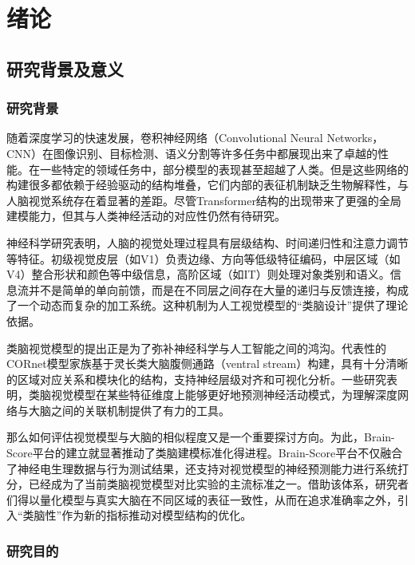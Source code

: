 
\chapter{绪论}

\section{研究背景及意义}

\subsection{研究背景}

随着深度学习的快速发展，卷积神经网络（Convolutional Neural Networks，CNN）在图像识别、目标检测、语义分割等许多任务中都展现出来了卓越的性能。在一些特定的领域任务中，部分模型的表现甚至超越了人类。但是这些网络的构建很多都依赖于经验驱动的结构堆叠，它们内部的表征机制缺乏生物解释性，与人脑视觉系统存在着显著的差距。尽管Transformer结构的出现带来了更强的全局建模能力，但其与人类神经活动的对应性仍然有待研究\cite{ramachandram2017deep}。

神经科学研究表明，人脑的视觉处理过程具有层级结构、时间递归性和注意力调节等特征。初级视觉皮层（如V1）负责边缘、方向等低级特征编码，中层区域（如V4）整合形状和颜色等中级信息，高阶区域（如IT）则处理对象类别和语义。信息流并不是简单的单向前馈，而是在不同层之间存在大量的递归与反馈连接，构成了一个动态而复杂的加工系统。这种机制为人工视觉模型的“类脑设计”提供了理论依据\cite{dicarlo2012does}。

类脑视觉模型的提出正是为了弥补神经科学与人工智能之间的鸿沟。代表性的CORnet模型家族基于灵长类大脑腹侧通路（ventral stream）构建，具有十分清晰的区域对应关系和模块化的结构，支持神经层级对齐和可视化分析。一些研究表明，类脑视觉模型在某些特征维度上能够更好地预测神经活动模式，为理解深度网络与大脑之间的关联机制提供了有力的工具\cite{ kubilius2019brain}。

那么如何评估视觉模型与大脑的相似程度又是一个重要探讨方向。为此，Brain-Score平台的建立就显著推动了类脑建模标准化得进程\cite{schrimpf2018brain}。Brain-Score平台不仅融合了神经电生理数据与行为测试结果，还支持对视觉模型的神经预测能力进行系统打分，已经成为了当前类脑视觉模型对比实验的主流标准之一。借助该体系，研究者们得以量化模型与真实大脑在不同区域的表征一致性，从而在追求准确率之外，引入“类脑性”作为新的指标推动对模型结构的优化。

\subsection{研究目的}

